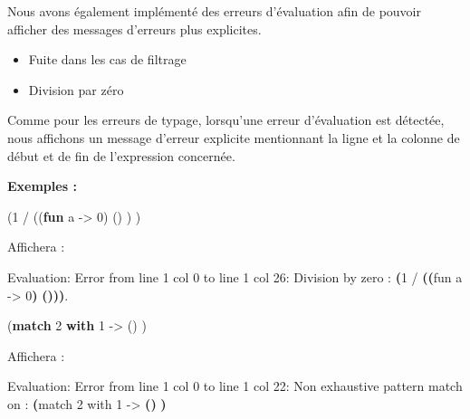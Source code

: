 \documentclass[
  12pt,
]{article}
\newenvironment{Shaded}{}{}
\newcommand{\AttributeTok}[1]{\textcolor[rgb]{0.49,0.56,0.16}{#1}}
\newcommand{\BuiltInTok}[1]{\textcolor[rgb]{0.00,0.50,0.00}{#1}}
\newcommand{\DecValTok}[1]{\textcolor[rgb]{0.25,0.63,0.44}{#1}}
\newcommand{\ErrorTok}[1]{\textcolor[rgb]{1.00,0.00,0.00}{\textbf{#1}}}
\newcommand{\ExtensionTok}[1]{#1}
\newcommand{\KeywordTok}[1]{\textcolor[rgb]{0.00,0.44,0.13}{\textbf{#1}}}
\newcommand{\NormalTok}[1]{#1}
\newcommand{\OperatorTok}[1]{\textcolor[rgb]{0.40,0.40,0.40}{#1}}
\providecommand{\tightlist}{%
  \setlength{\itemsep}{0pt}\setlength{\parskip}{0pt}}
\begin{document}
Nous avons également implémenté des erreurs d'évaluation afin de pouvoir
afficher des messages d'erreurs plus explicites.\\

\begin{itemize}
\tightlist
\item
  Fuite dans les cas de filtrage
\item
  Division par zéro
\end{itemize}

Comme pour les erreurs de typage, lorsqu'une erreur d'évaluation est
détectée, nous affichons un message d'erreur explicite mentionnant la
ligne et la colonne de début et de fin de l'expression concernée.

\textbf{Exemples :}

\begin{Shaded}
\begin{Highlighting}[]
\NormalTok{(}\DecValTok{1}\NormalTok{ / ((}\KeywordTok{fun}\NormalTok{ a {-}\textgreater{} }\DecValTok{0}\NormalTok{) () )  ) }
\end{Highlighting}
\end{Shaded}

Affichera :

\begin{Shaded}
\begin{Highlighting}[]
\ExtensionTok{Evaluation:}
\ExtensionTok{Error}\NormalTok{ from line 1 col 0 to line 1 col 26: }
  \ExtensionTok{Division}\NormalTok{ by zero : }\ErrorTok{(}\ExtensionTok{1}\NormalTok{ / }\ErrorTok{(}\KeywordTok{(}\ExtensionTok{fun}\NormalTok{ a }\AttributeTok{{-}}\OperatorTok{\textgreater{}}\NormalTok{ 0}\KeywordTok{)} \KeywordTok{()))}\BuiltInTok{.}
\end{Highlighting}
\end{Shaded}

\begin{Shaded}
\begin{Highlighting}[]
\NormalTok{(}\KeywordTok{match} \DecValTok{2} \KeywordTok{with} 
 \DecValTok{1}\NormalTok{ {-}\textgreater{} ()}
\NormalTok{)}
\end{Highlighting}
\end{Shaded}

Affichera :

\begin{Shaded}
\begin{Highlighting}[]
\ExtensionTok{Evaluation:}
\ExtensionTok{Error}\NormalTok{ from line 1 col 0 to line 1 col 22: }
  \ExtensionTok{Non}\NormalTok{ exhaustive pattern match on :}
\KeywordTok{(}\ExtensionTok{match}\NormalTok{ 2 with }
 \ExtensionTok{1} \AttributeTok{{-}}\OperatorTok{\textgreater{}} \ErrorTok{(}\KeywordTok{)}
\KeywordTok{)}
\end{Highlighting}
\end{Shaded}
\end{document}
